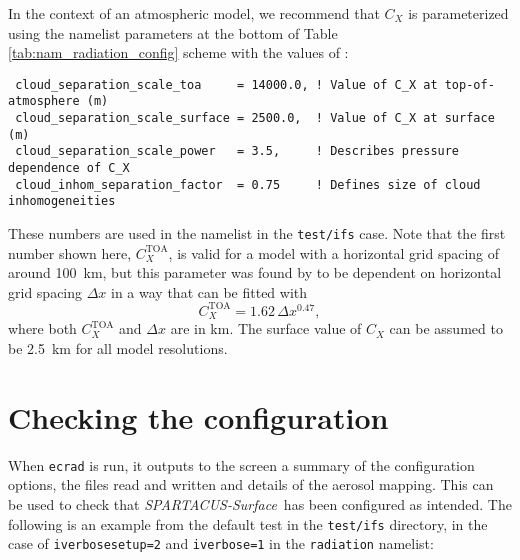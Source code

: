 \documentclass[a4,oneside]{article}
\def\codesize{\small}
\def\spsurf{\emph{SPARTACUS-Surface}}
\def\code#1{{\codesize\texttt{#1}}}
\begin{document}
In the context of an atmospheric model, we recommend that $C_X$ is
parameterized using the namelist parameters at the bottom of Table
\ref{tab:nam_radiation_config} scheme with the values of
\cite{Fielding+2020}:
%
\begin{lstlisting}
 cloud_separation_scale_toa     = 14000.0, ! Value of C_X at top-of-atmosphere (m)
 cloud_separation_scale_surface = 2500.0,  ! Value of C_X at surface (m)
 cloud_separation_scale_power   = 3.5,     ! Describes pressure dependence of C_X
 cloud_inhom_separation_factor  = 0.75     ! Defines size of cloud inhomogeneities
\end{lstlisting}
%
These numbers are used in the namelist in the \code{test/ifs}
case. Note that the first number shown here, $C_X^\mathrm{TOA}$, is
valid for a model with a horizontal grid spacing of around 100~km, but
this parameter was found by \cite{Fielding+2020} to be dependent on
horizontal grid spacing $\Delta x$ in a way that can be fitted with
%
\begin{equation}
C_X^\mathrm{TOA}=1.62\,\Delta x^{0.47},
\end{equation}
%
where both $C_X^\mathrm{TOA}$ and $\Delta x$ are in km. The surface
value of $C_X$ can be assumed to be 2.5~km for all model
resolutions.


\section{Checking the configuration}
\label{sec:checking}
When \code{ecrad} is run, it outputs to the screen a summary of the
configuration options, the files read and written and details of the
aerosol mapping. This can be used to check that \spsurf\ has been
configured as intended.  The following is an example from the default
test in the \code{test/ifs} directory, in the case of
\code{iverbosesetup=2} and \code{iverbose=1} in the \code{radiation}
namelist:
\end{document}
